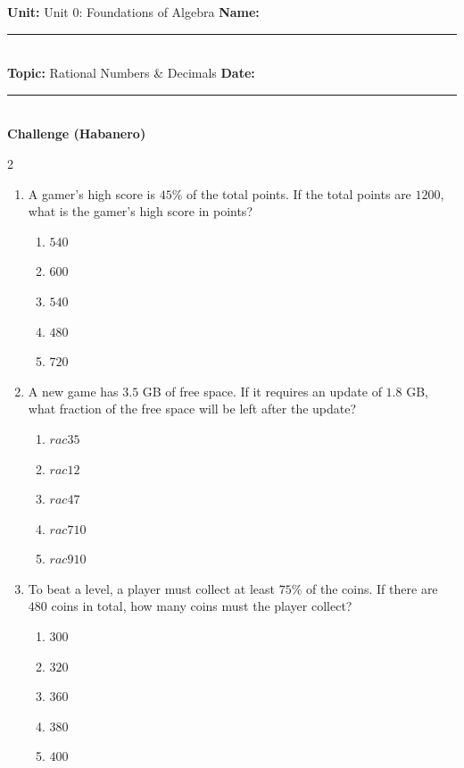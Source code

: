 \documentclass[10pt]{article}
\begin{document}
\enlargethispage{2.5cm}

\begin{tcolorbox}[colback=mainblue!5, colframe=mainblue, sharp corners, boxrule=0.5pt]
    \small \textbf{Unit:} Unit 0: Foundations of Algebra \hfill \textbf{Name:} \rule{3cm}{0.4pt} \\
    \small \textbf{Topic:} Rational Numbers & Decimals \hfill \textbf{Date:} \rule{2cm}{0.4pt} \\
    \centering \textbf{\large Challenge (Habanero)}
\end{tcolorbox}

\vspace{0.2cm}

\begin{multicols}{2}
\begin{enumerate}[label=\textbf{Q\arabic*.}, leftmargin=*, itemsep=6pt, parsep=0pt]

  \item \small A gamer's high score is $45\%$ of the total points. If the total points are $1200$, what is the gamer's high score in points?
  \begin{enumerate}[label=(\Alph*), leftmargin=0.6cm, nosep, itemsep=2pt]
    \item $540$
    \item $600$
    \item $540$
    \item $480$
    \item $720$
  \end{enumerate}

  \item \small A new game has $3.5$ GB of free space. If it requires an update of $1.8$ GB, what fraction of the free space will be left after the update?
  \begin{enumerate}[label=(\Alph*), leftmargin=0.6cm, nosep, itemsep=2pt]
    \item $rac{3}{5}$
    \item $rac{1}{2}$
    \item $rac{4}{7}$
    \item $rac{7}{10}$
    \item $rac{9}{10}$
  \end{enumerate}

  \item \small To beat a level, a player must collect at least $75\%$ of the coins. If there are $480$ coins in total, how many coins must the player collect?
  \begin{enumerate}[label=(\Alph*), leftmargin=0.6cm, nosep, itemsep=2pt]
    \item $300$
    \item $320$
    \item $360$
    \item $380$
    \item $400$
  \end{enumerate}


\end{enumerate}
\end{multicols}
\end{document}
